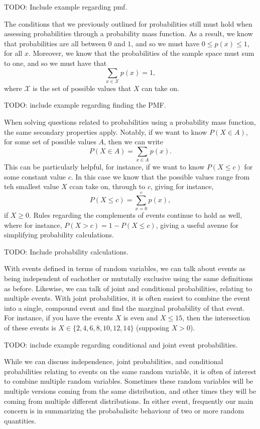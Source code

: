 \documentclass[
  letterpaper,
  DIV=11,
  numbers=noendperiod]{scrreprt}
\begin{document}
TODO: Include example regarding pmf.

The conditions that we previously outlined for probabilities still must
hold when assessing probabilities through a probability mass function.
As a result, we know that probabilities are all between \(0\) and \(1\),
and so we must have \(0 \leq p(x) \leq 1\), for all \(x\). Moreover, we
know that the probabilities of the sample space must sum to one, and so
we must have that \[\sum_{x\in\mathcal{X}} p(x) = 1,\] where
\(\mathcal{X}\) is the set of possible values that \(X\) can take on.

TODO: include example regarding finding the PMF.

When solving questions related to probabilities using a probability mass
function, the same secondary properties apply. Notably, if we want to
know \(P(X\in A)\), for some set of possible values \(A\), then we can
write \[P(X\in A) = \sum_{x\in A}p(x).\] This can be particularly
helpful, for instance, if we want to know \(P(X \leq c)\) for some
constant value \(c\). In this case we know that the possible values
range from teh smallest value \(X\) ccan take on, through to \(c\),
giving for instance, \[P(X\leq c) = \sum_{x=0}^c p(x),\] if
\(X \geq 0\). Rules regarding the complements of events continue to hold
as well, where for instance, \(P(X > c) = 1 - P(X\leq c)\), giving a
useful avenue for simplifying probability calculations.

TODO: Include probability calculations.

With events defined in terms of random variables, we can talk about
events as being independent of eachother or mututally exclusive using
the same definitions as before. Likewise, we can talk of joint and
conditional probabilities, relating to multiple events. With joint
probabilities, it is often easiest to combine the event into a single,
compound event and find the marginal probability of that event. For
instance, if you have the events \(X\) is even and \(X \leq 15\), then
the intersection of these events is \(X \in \{2,4,6,8,10,12,14\}\)
(supposing \(X > 0\)).

TODO: include example regarding conditional and joint event
probabilities.

While we can discuss independence, joint probabilities, and conditional
probabilities relating to events on the same random variable, it is
often of interest to combine multiple random variables. Sometimes these
random variables will be multiple versions coming from the same
distribution, and other times they will be coming from multiple
different distributions. In either event, frequently our main concern is
in summarizing the probabalisitc behaviour of two or more random
quantities.
\end{document}
